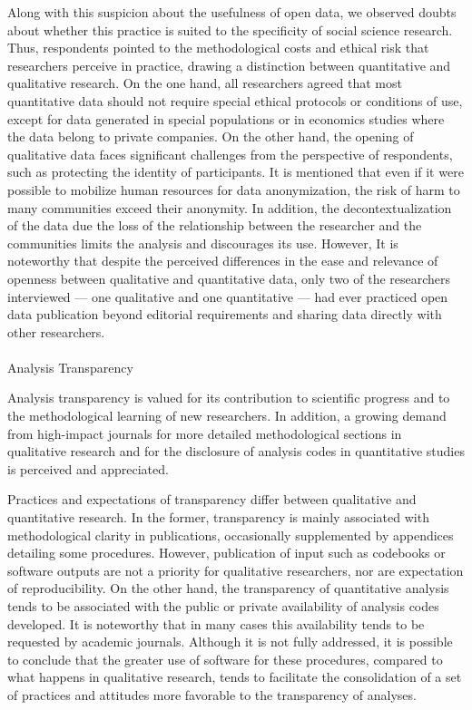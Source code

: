 \documentclass[
  english,
  letterpaper,
]{article}
\makeatletter
\let\oldparagraph\paragraph
\renewcommand{\paragraph}{
    \@ifstar
      \xxxParagraphStar
      \xxxParagraphNoStar
  }
\newcommand{\xxxParagraphStar}[1]{\oldparagraph*{#1}\mbox{}}
\newcommand{\xxxParagraphNoStar}[1]{\oldparagraph{#1}\mbox{}}
\makeatother
\begin{document}
Along with this suspicion about the usefulness of open data, we observed
doubts about whether this practice is suited to the specificity of
social science research. Thus, respondents pointed to the methodological
costs and ethical risk that researchers perceive in practice, drawing a
distinction between quantitative and qualitative research. On the one
hand, all researchers agreed that most quantitative data should not
require special ethical protocols or conditions of use, except for data
generated in special populations or in economics studies where the data
belong to private companies. On the other hand, the opening of
qualitative data faces significant challenges from the perspective of
respondents, such as protecting the identity of participants. It is
mentioned that even if it were possible to mobilize human resources for
data anonymization, the risk of harm to many communities exceed their
anonymity. In addition, the decontextualization of the data due the loss
of the relationship between the researcher and the communities limits
the analysis and discourages its use. However, It is noteworthy that
despite the perceived differences in the ease and relevance of openness
between qualitative and quantitative data, only two of the researchers
interviewed --- one qualitative and one quantitative --- had ever
practiced open data publication beyond editorial requirements and
sharing data directly with other researchers.

\paragraph{Analysis Transparency}\label{analysis-transparency}

Analysis transparency is valued for its contribution to scientific
progress and to the methodological learning of new researchers. In
addition, a growing demand from high-impact journals for more detailed
methodological sections in qualitative research and for the disclosure
of analysis codes in quantitative studies is perceived and appreciated.

Practices and expectations of transparency differ between qualitative
and quantitative research. In the former, transparency is mainly
associated with methodological clarity in publications, occasionally
supplemented by appendices detailing some procedures. However,
publication of input such as codebooks or software outputs are not a
priority for qualitative researchers, nor are expectation of
reproducibility. On the other hand, the transparency of quantitative
analysis tends to be associated with the public or private availability
of analysis codes developed. It is noteworthy that in many cases this
availability tends to be requested by academic journals. Although it is
not fully addressed, it is possible to conclude that the greater use of
software for these procedures, compared to what happens in qualitative
research, tends to facilitate the consolidation of a set of practices
and attitudes more favorable to the transparency of analyses.
\end{document}
